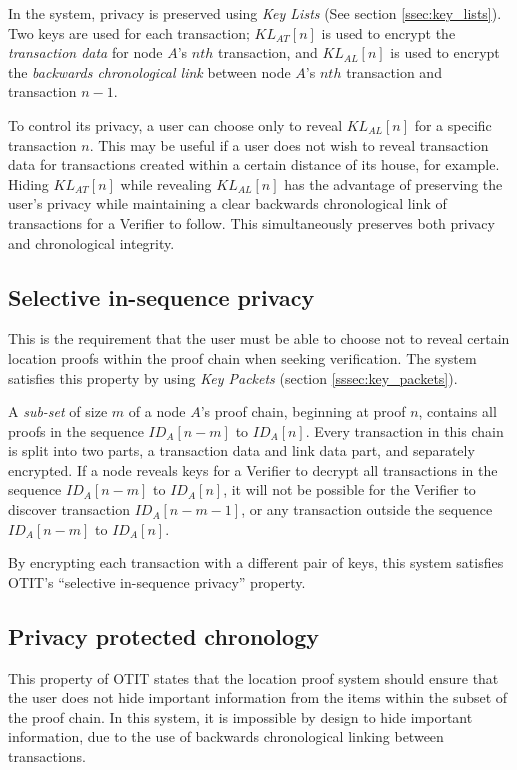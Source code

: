 In the system, privacy is preserved using \textit{Key Lists} (See section \ref{ssec:key_lists}). Two keys are used for each transaction; $KL_{AT}[n]$ is used to encrypt the \textit{transaction data} for node $A$'s $nth$ transaction, and $KL_{AL}[n]$ is used to encrypt the \textit{backwards chronological link} between node $A$'s $nth$ transaction and transaction $n-1$.

To control its privacy, a user can choose only to reveal $KL_{AL}[n]$ for a specific transaction $n$. This may be useful if a user does not wish to reveal transaction data for transactions created within a certain distance of its house, for example. Hiding $KL_{AT}[n]$ while revealing $KL_{AL}[n]$ has the advantage of preserving the user's privacy while maintaining a clear backwards chronological link of transactions for a Verifier to follow. This simultaneously preserves both privacy and chronological integrity.

\subsection{Selective in-sequence privacy}
This is the requirement that the user must be able to choose not to reveal certain location proofs within the proof chain when seeking verification. The system satisfies this property by using \textit{Key Packets} (section \ref{sssec:key_packets}).

A \textit{sub-set} of size $m$ of a node $A$'s proof chain, beginning at proof $n$, contains all proofs in the sequence $ID_{A}[n-m]$ to $ID_{A}[n]$. Every transaction in this chain is split into two parts, a transaction data and link data part, and separately encrypted. If a node reveals keys for a Verifier to decrypt all transactions in the sequence $ID_{A}[n-m]$ to $ID_{A}[n]$, it will not be possible for the Verifier to discover transaction $ID_{A}[n-m-1]$, or any transaction outside the sequence $ID_{A}[n-m]$ to $ID_{A}[n]$.

By encrypting each transaction with a different pair of keys, this system satisfies OTIT's ``selective in-sequence privacy'' property.

\subsection{Privacy protected chronology}
This property of OTIT states that the location proof system should ensure that the user does not hide important information from the items within the subset of the proof chain. In this system, it is impossible by design to hide important information, due to the use of backwards chronological linking between transactions. 

